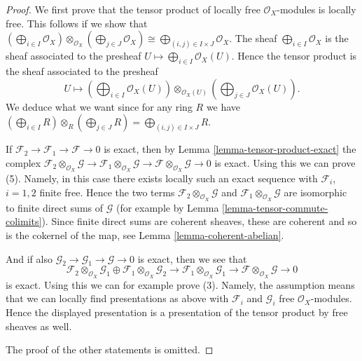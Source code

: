 \documentclass{stacks-project}
\theoremstyle{plain}
\theoremstyle{definition}
\theoremstyle{remark}
\numberwithin{equation}{subsection}
\begin{document}
\begin{proof}
We first prove that the tensor product of locally free
$\mathcal{O}_X$-modules is locally free. This follows if we show
that
$(\bigoplus_{i \in I} \mathcal{O}_X) \otimes_{\mathcal{O}_X}
(\bigoplus_{j \in J} \mathcal{O}_X) \cong
\bigoplus_{(i, j) \in I \times J} \mathcal{O}_X$.
The sheaf $\bigoplus_{i \in I} \mathcal{O}_X$ is the sheaf associated
to the presheaf $U \mapsto \bigoplus_{i \in I} \mathcal{O}_X(U)$.
Hence the tensor product is the sheaf associated
to the presheaf
$$
U \longmapsto
(\bigoplus\nolimits_{i \in I} \mathcal{O}_X(U))
\otimes_{\mathcal{O}_X(U)}
(\bigoplus\nolimits_{j \in J} \mathcal{O}_X(U)).
$$
We deduce what we want since for any ring $R$ we have
$(\bigoplus_{i \in I} R) \otimes_R (\bigoplus_{j \in J} R) =
\bigoplus_{(i, j) \in I \times J} R$.

\medskip\noindent
If $\mathcal{F}_2 \to \mathcal{F}_1 \to \mathcal{F} \to 0$
is exact, then by Lemma \ref{lemma-tensor-product-exact}
the complex
$\mathcal{F}_2 \otimes_{\mathcal{O}_X} \mathcal{G} \to
\mathcal{F}_1 \otimes_{\mathcal{O}_X} \mathcal{G} \to
\mathcal{F} \otimes_{\mathcal{O}_X} \mathcal{G} \to 0$
is exact. Using this we can prove (5). Namely, in this case there
exists locally such an exact sequence with $\mathcal{F}_i$, $i = 1, 2$
finite free. Hence the two terms
$\mathcal{F}_2 \otimes_{\mathcal{O}_X} \mathcal{G}$ and
$\mathcal{F}_1 \otimes_{\mathcal{O}_X} \mathcal{G}$
are isomorphic to finite direct sums of $\mathcal{G}$ (for example
by Lemma \ref{lemma-tensor-commute-colimits}).
Since finite direct sums are coherent sheaves, these are coherent
and so is the cokernel of the map, see Lemma \ref{lemma-coherent-abelian}.

\medskip\noindent
And if also
$\mathcal{G}_2 \to \mathcal{G}_1 \to \mathcal{G} \to 0$
is exact, then we see that
$$
\mathcal{F}_2 \otimes_{\mathcal{O}_X} \mathcal{G}_1
\oplus
\mathcal{F}_1 \otimes_{\mathcal{O}_X} \mathcal{G}_2
\to
\mathcal{F}_1 \otimes_{\mathcal{O}_X} \mathcal{G}_1
\to
\mathcal{F} \otimes_{\mathcal{O}_X} \mathcal{G}
\to 0
$$
is exact. Using this we can for example prove (3).
Namely, the assumption means that we can locally find presentations
as above with $\mathcal{F}_i$ and $\mathcal{G}_i$
free $\mathcal{O}_X$-modules. Hence the displayed presentation
is a presentation of the tensor product by free sheaves as well.

\medskip\noindent
The proof of the other statements is omitted.
\end{proof}
\end{document}
